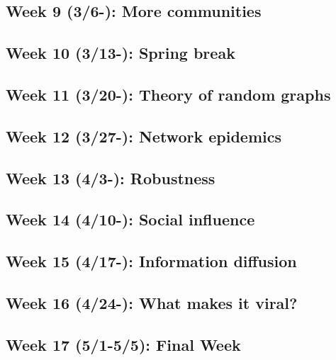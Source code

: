 \documentclass[11pt,article,oneside]{memoir}
\begin{document}
\subsection{Week 9 (3/6-):  More communities}
\subsection{\color{gray}Week 10 (3/13-): Spring break}
\subsection{Week 11 (3/20-): Theory of random graphs}
\subsection{Week 12 (3/27-): Network epidemics}
\subsection{Week 13 (4/3-): Robustness}
\subsection{Week 14 (4/10-): Social influence}
\subsection{Week 15 (4/17-): Information diffusion}
\subsection{Week 16 (4/24-): What makes it viral?}
\subsection{Week 17 (5/1-5/5): Final Week}
\end{document}
